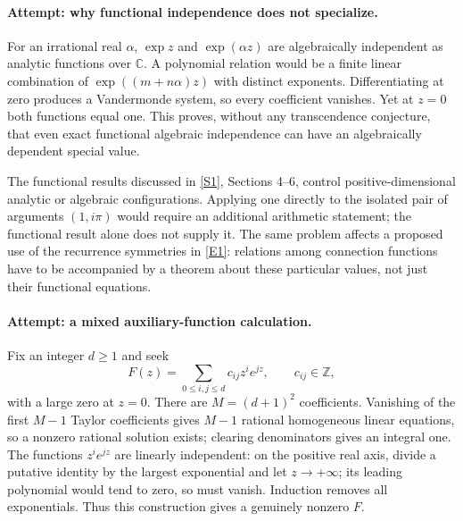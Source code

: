\documentclass[11pt,a4paper]{article}
\newcommand{\Z}{\mathbb{Z}}
\newcommand{\C}{\mathbb{C}}
\newcommand{\sref}[2]{\hyperlink{source:#1:#2}{[S#2]}}
\newcommand{\eref}[2]{\hyperlink{extra:#1:#2}{[E#2]}}
\numberwithin{equation}{section}
\begin{document}
\paragraph{Attempt: why functional independence does not specialize.}
For an irrational real $\alpha$, $\exp z$ and $\exp(\alpha z)$ are
algebraically independent as analytic functions over $\C$. A polynomial
relation would be a finite linear combination of
$\exp((m+n\alpha)z)$ with distinct exponents. Differentiating at zero
produces a Vandermonde system, so every coefficient vanishes. Yet at
$z=0$ both functions equal one. This proves, without any transcendence
conjecture, that even exact functional algebraic independence can have
an algebraically dependent special value.

The functional results discussed in \sref{168}{1}, Sections 4--6,
control positive-dimensional analytic or algebraic configurations.
Applying one directly to the isolated pair of arguments $(1,i\pi)$
would require an additional arithmetic statement; the functional
result alone does not supply it. The same problem affects a proposed
use of the recurrence symmetries in \eref{168}{1}: relations among
connection functions have to be accompanied by a theorem about these
particular values, not just their functional equations.

\paragraph{Attempt: a mixed auxiliary-function calculation.}
Fix an integer $d\geq1$ and seek
\begin{equation}
 F(z)=\sum_{0\leq i,j\leq d}c_{ij}z^i e^{jz},
 \qquad c_{ij}\in\Z,
\end{equation}
with a large zero at $z=0$. There are $M=(d+1)^2$ coefficients.
Vanishing of the first $M-1$ Taylor coefficients gives $M-1$ rational
homogeneous linear equations, so a nonzero rational solution exists;
clearing denominators gives an integral one. The functions $z^ie^{jz}$
are linearly independent: on the positive real axis, divide a putative
identity by the largest exponential and let $z\to+\infty$; its leading
polynomial would tend to zero, so must vanish. Induction removes all
exponentials. Thus this construction gives a genuinely nonzero $F$.
\end{document}
